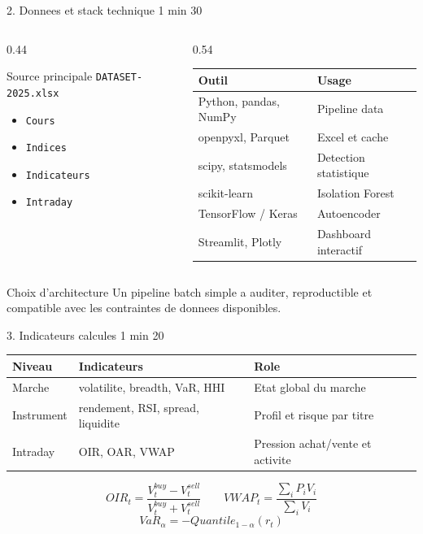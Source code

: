 \documentclass[aspectratio=169,10pt]{beamer}
\newcommand{\duration}[1]{\hfill{\scriptsize\color{bvcgold}#1}}
\begin{document}
\begin{frame}{2. Donnees et stack technique \duration{1 min 30}}
  \begin{columns}[T,onlytextwidth]
    \begin{column}{0.44\textwidth}
      \begin{block}{Source principale}
        \texttt{DATASET-2025.xlsx}
      \end{block}
      \begin{itemize}
        \item \texttt{Cours}
        \item \texttt{Indices}
        \item \texttt{Indicateurs}
        \item \texttt{Intraday}
      \end{itemize}
    \end{column}
    \begin{column}{0.54\textwidth}
      \small
      \begin{tabular}{ll}
        \toprule
        Outil & Usage \\
        \midrule
        Python, pandas, NumPy & Pipeline data \\
        openpyxl, Parquet & Excel et cache \\
        scipy, statsmodels & Detection statistique \\
        scikit-learn & Isolation Forest \\
        TensorFlow / Keras & Autoencoder \\
        Streamlit, Plotly & Dashboard interactif \\
        \bottomrule
      \end{tabular}
    \end{column}
  \end{columns}
  \vspace{0.7em}
  \begin{block}{Choix d'architecture}
    Un pipeline batch simple a auditer, reproductible et compatible avec les contraintes de donnees disponibles.
  \end{block}
\end{frame}

\begin{frame}{3. Indicateurs calcules \duration{1 min 20}}
  \small
  \begin{tabular}{lll}
    \toprule
    Niveau & Indicateurs & Role \\
    \midrule
    Marche & volatilite, breadth, VaR, HHI & Etat global du marche \\
    Instrument & rendement, RSI, spread, liquidite & Profil et risque par titre \\
    Intraday & OIR, OAR, VWAP & Pression achat/vente et activite \\
    \bottomrule
  \end{tabular}
  \vspace{0.8em}
  \[
    OIR_t=\frac{V^{buy}_t-V^{sell}_t}{V^{buy}_t+V^{sell}_t}
    \qquad
    VWAP_t=\frac{\sum_i P_iV_i}{\sum_i V_i}
  \]
  \[
    VaR_{\alpha}=-Quantile_{1-\alpha}(r_t)
  \]
\end{frame}
\end{document}
